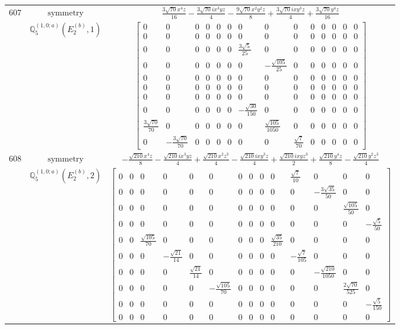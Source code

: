 \documentclass[fleqn,8pt,landscape]{jsarticle}
\begin{document}
\begin{longtable}{ccc}
$ 607 $ & $ \text{symmetry} $ & $ \frac{3 \sqrt{70} x^{4} z}{16} - \frac{3 \sqrt{70} i x^{3} y z}{4} - \frac{9 \sqrt{70} x^{2} y^{2} z}{8} + \frac{3 \sqrt{70} i x y^{3} z}{4} + \frac{3 \sqrt{70} y^{4} z}{16} $ \\
$  $ & $ \mathbb{Q}_{5}^{(1,0;a)}(E_{2}^{(b)},1) $ & $ \begin{bmatrix} 0 & 0 & 0 & 0 & 0 & 0 & 0 & 0 & 0 & 0 & 0 & 0 & 0 & 0 \\ 0 & 0 & 0 & 0 & 0 & 0 & 0 & 0 & 0 & 0 & 0 & 0 & 0 & 0 \\ 0 & 0 & 0 & 0 & 0 & 0 & \frac{3 \sqrt{5}}{25} & 0 & 0 & 0 & 0 & 0 & 0 & 0 \\ 0 & 0 & 0 & 0 & 0 & 0 & 0 & - \frac{\sqrt{105}}{25} & 0 & 0 & 0 & 0 & 0 & 0 \\ 0 & 0 & 0 & 0 & 0 & 0 & 0 & 0 & 0 & 0 & 0 & 0 & 0 & 0 \\ 0 & 0 & 0 & 0 & 0 & 0 & 0 & 0 & 0 & 0 & 0 & 0 & 0 & 0 \\ 0 & 0 & 0 & 0 & 0 & 0 & 0 & 0 & 0 & 0 & 0 & 0 & 0 & 0 \\ 0 & 0 & 0 & 0 & 0 & 0 & - \frac{\sqrt{30}}{150} & 0 & 0 & 0 & 0 & 0 & 0 & 0 \\ \frac{3 \sqrt{70}}{70} & 0 & 0 & 0 & 0 & 0 & 0 & \frac{\sqrt{105}}{1050} & 0 & 0 & 0 & 0 & 0 & 0 \\ 0 & - \frac{3 \sqrt{70}}{70} & 0 & 0 & 0 & 0 & 0 & 0 & \frac{\sqrt{7}}{70} & 0 & 0 & 0 & 0 & 0 \end{bmatrix} $ \\ \hline
$ 608 $ & $ \text{symmetry} $ & $ - \frac{\sqrt{210} x^{4} z}{8} - \frac{\sqrt{210} i x^{3} y z}{4} + \frac{\sqrt{210} x^{2} z^{3}}{4} - \frac{\sqrt{210} i x y^{3} z}{4} + \frac{\sqrt{210} i x y z^{3}}{2} + \frac{\sqrt{210} y^{4} z}{8} - \frac{\sqrt{210} y^{2} z^{3}}{4} $ \\
$  $ & $ \mathbb{Q}_{5}^{(1,0;a)}(E_{2}^{(b)},2) $ & $ \begin{bmatrix} 0 & 0 & 0 & 0 & 0 & 0 & 0 & 0 & 0 & 0 & \frac{\sqrt{7}}{10} & 0 & 0 & 0 \\ 0 & 0 & 0 & 0 & 0 & 0 & 0 & 0 & 0 & 0 & 0 & - \frac{3 \sqrt{35}}{50} & 0 & 0 \\ 0 & 0 & 0 & 0 & 0 & 0 & 0 & 0 & 0 & 0 & 0 & 0 & \frac{\sqrt{105}}{50} & 0 \\ 0 & 0 & 0 & 0 & 0 & 0 & 0 & 0 & 0 & 0 & 0 & 0 & 0 & - \frac{\sqrt{5}}{50} \\ 0 & 0 & \frac{\sqrt{105}}{70} & 0 & 0 & 0 & 0 & 0 & 0 & \frac{\sqrt{35}}{210} & 0 & 0 & 0 & 0 \\ 0 & 0 & 0 & - \frac{\sqrt{21}}{14} & 0 & 0 & 0 & 0 & 0 & 0 & - \frac{\sqrt{7}}{105} & 0 & 0 & 0 \\ 0 & 0 & 0 & 0 & \frac{\sqrt{21}}{14} & 0 & 0 & 0 & 0 & 0 & 0 & - \frac{\sqrt{210}}{1050} & 0 & 0 \\ 0 & 0 & 0 & 0 & 0 & - \frac{\sqrt{105}}{70} & 0 & 0 & 0 & 0 & 0 & 0 & \frac{2 \sqrt{70}}{525} & 0 \\ 0 & 0 & 0 & 0 & 0 & 0 & 0 & 0 & 0 & 0 & 0 & 0 & 0 & - \frac{\sqrt{5}}{150} \\ 0 & 0 & 0 & 0 & 0 & 0 & 0 & 0 & 0 & 0 & 0 & 0 & 0 & 0 \end{bmatrix} $ \\ \hline

\end{longtable}
\end{document}
